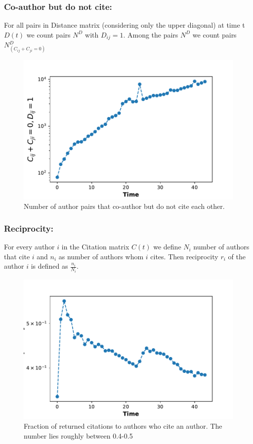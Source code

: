 \documentclass[aps, pre, twocolumn, nofootinbib]{revtex4-1}
\begin{document}
\subsubsection{Co-author but do not cite:}
For all pairs in Distance matrix (considering only the upper diagonal) at time t $D(t)$ we count pairs $N^D$ with  $D_{ij} = 1$. Among the pairs $N^D$ we count pairs $N^D_{(C_{ij} + C_{ji}=0)}$
\begin{figure}
	\centering
	\includegraphics[scale = 0.45]{plots/d1_zcit}
	
	\captionsetup{singlelinecheck=false, justification=raggedright,  labelsep=space}
	\caption{Number of author pairs that co-author but do not cite each other.}
	\label{f2}
\end{figure}

\subsubsection{Reciprocity:}
For every author $i$ in the Citation matrix $C(t)$ we define $N_i$ number of authors that cite $i$ and $n_i$ as number of authors whom $i$ cites. Then reciprocity $r_i$ of the author $i$ is defined as $\frac{n_i}{N_i}$. 

\begin{figure}
	\centering
	\includegraphics[scale = 0.45]{plots/rec}
	
	\captionsetup{singlelinecheck=false, justification=raggedright,  labelsep=space}
	\caption{Fraction of returned citations to authors who cite an author. The number lies roughly between 0.4-0.5}
	\label{freci}
\end{figure}
\end{document}
